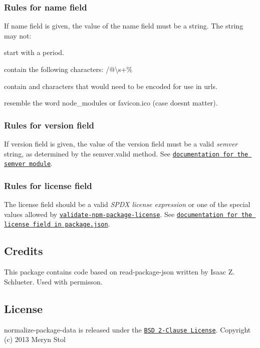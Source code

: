 \subsubsection*{Rules for name field}

If {\ttfamily name} field is given, the value of the name field must be a string. The string may not\+:


\begin{DoxyItemize}
\item start with a period.
\item contain the following characters\+: {\ttfamily /@\textbackslash{}s+\%}
\item contain and characters that would need to be encoded for use in urls.
\item resemble the word {\ttfamily node\+\_\+modules} or {\ttfamily favicon.\+ico} (case doesn\textquotesingle{}t matter).
\end{DoxyItemize}

\subsubsection*{Rules for version field}

If {\ttfamily version} field is given, the value of the version field must be a valid {\itshape semver} string, as determined by the {\ttfamily semver.\+valid} method. See \href{https://github.com/isaacs/node-semver}{\tt documentation for the semver module}.

\subsubsection*{Rules for license field}

The {\ttfamily license} field should be a valid {\itshape S\+P\+DX license expression} or one of the special values allowed by \href{https://npmjs.com/packages/validate-npm-package-license}{\tt validate-\/npm-\/package-\/license}. See \href{https://docs.npmjs.com/files/package.json#license}{\tt documentation for the license field in package.\+json}.

\subsection*{Credits}

This package contains code based on read-\/package-\/json written by Isaac Z. Schlueter. Used with permisson.

\subsection*{License}

normalize-\/package-\/data is released under the \href{http://opensource.org/licenses/MIT}{\tt B\+SD 2-\/\+Clause License}. Copyright (c) 2013 Meryn Stol 
